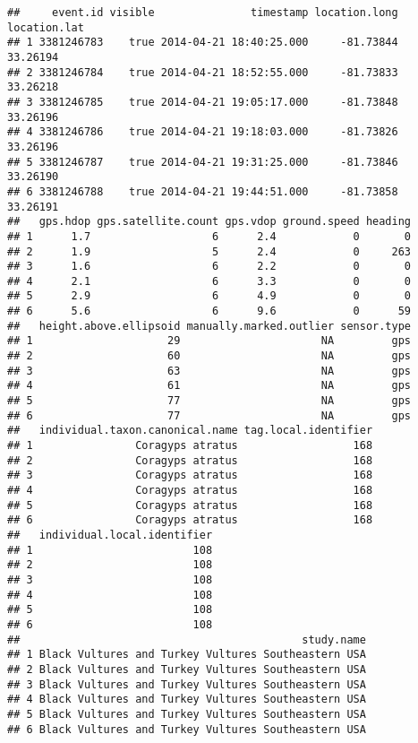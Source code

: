 \documentclass[
]{article}
\begin{document}
\begin{verbatim}
##     event.id visible               timestamp location.long location.lat
## 1 3381246783    true 2014-04-21 18:40:25.000     -81.73844     33.26194
## 2 3381246784    true 2014-04-21 18:52:55.000     -81.73833     33.26218
## 3 3381246785    true 2014-04-21 19:05:17.000     -81.73848     33.26196
## 4 3381246786    true 2014-04-21 19:18:03.000     -81.73826     33.26196
## 5 3381246787    true 2014-04-21 19:31:25.000     -81.73846     33.26190
## 6 3381246788    true 2014-04-21 19:44:51.000     -81.73858     33.26191
##   gps.hdop gps.satellite.count gps.vdop ground.speed heading
## 1      1.7                   6      2.4            0       0
## 2      1.9                   5      2.4            0     263
## 3      1.6                   6      2.2            0       0
## 4      2.1                   6      3.3            0       0
## 5      2.9                   6      4.9            0       0
## 6      5.6                   6      9.6            0      59
##   height.above.ellipsoid manually.marked.outlier sensor.type
## 1                     29                      NA         gps
## 2                     60                      NA         gps
## 3                     63                      NA         gps
## 4                     61                      NA         gps
## 5                     77                      NA         gps
## 6                     77                      NA         gps
##   individual.taxon.canonical.name tag.local.identifier
## 1                Coragyps atratus                  168
## 2                Coragyps atratus                  168
## 3                Coragyps atratus                  168
## 4                Coragyps atratus                  168
## 5                Coragyps atratus                  168
## 6                Coragyps atratus                  168
##   individual.local.identifier
## 1                         108
## 2                         108
## 3                         108
## 4                         108
## 5                         108
## 6                         108
##                                            study.name
## 1 Black Vultures and Turkey Vultures Southeastern USA
## 2 Black Vultures and Turkey Vultures Southeastern USA
## 3 Black Vultures and Turkey Vultures Southeastern USA
## 4 Black Vultures and Turkey Vultures Southeastern USA
## 5 Black Vultures and Turkey Vultures Southeastern USA
## 6 Black Vultures and Turkey Vultures Southeastern USA
\end{verbatim}
\end{document}

